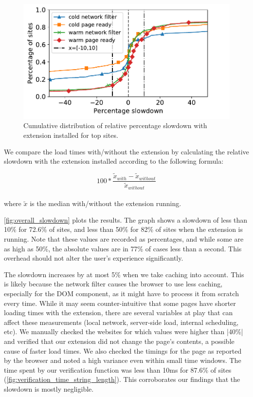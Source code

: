 \begin{figure}[h]
		\begin{center}
	\includegraphics[scale=0.5]{results/extension_slowdown_overall_small.pdf}
	\caption{Cumulative distribution of relative percentage slowdown with extension installed for top sites.}
	\label{fig:overall_slowdown}
\end{center}
	
\end{figure}

We compare the load times with/without the extension by calculating the relative slowdown with the extension installed according to the following formula:

\begin{equation*}
100*\frac{\tilde{x}_{with}-\tilde{x}_{without}}{\tilde{x}_{without}}
\end{equation*}
\\
where $\tilde{x}$ is the median with/without the extension running.

\autoref{fig:overall_slowdown} plots the results. The graph
shows a slowdown of less than 10\% for 72.6\% of sites, and less than
50\% for 82\% of sites when the extension is running. Note that these
values are recorded as percentages, and while some are as high as
50\%, the absolute values are in 77\% of cases less than a
second. This overhead should not alter the user's experience
significantly.

The slowdown increases by at most 5\% when we take caching into
account. This is likely because the network filter causes the browser
to use less caching, especially for the DOM component, as it might
have to process it from scratch every time. While it may seem
counter-intuitive that some pages have shorter loading times with
the extension, there are several variables at play that can affect
these measurements (local network, server-side load, internal
scheduling, etc). We manually checked the websites for which values
were higher than |40\%| and verified that our extension did not change
the page's contents, a possible cause of faster load times. We also
checked the timings for the page as reported by the browser and noted
a high variance even within small time windows. The time spent by our
verification function was less than 10ms for 87.6\% of sites
(\autoref{fig:verification_time_string_length}). This corroborates our
findings that the slowdown is mostly negligible.

